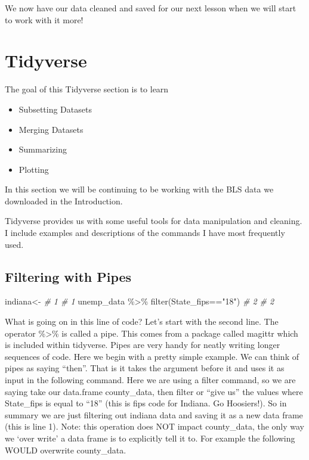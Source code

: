 \documentclass[
]{book}
\newenvironment{Shaded}{\begin{snugshade}}{\end{snugshade}}
\newcommand{\CommentTok}[1]{\textcolor[rgb]{0.56,0.35,0.01}{\textit{#1}}}
\newcommand{\FunctionTok}[1]{\textcolor[rgb]{0.00,0.00,0.00}{#1}}
\newcommand{\NormalTok}[1]{#1}
\newcommand{\OtherTok}[1]{\textcolor[rgb]{0.56,0.35,0.01}{#1}}
\newcommand{\SpecialCharTok}[1]{\textcolor[rgb]{0.00,0.00,0.00}{#1}}
\newcommand{\StringTok}[1]{\textcolor[rgb]{0.31,0.60,0.02}{#1}}
\providecommand{\tightlist}{%
  \setlength{\itemsep}{0pt}\setlength{\parskip}{0pt}}
\begin{document}
We now have our data cleaned and saved for our next lesson when we will start to work with it more!

\hypertarget{tidyverse}{%
\chapter{Tidyverse}\label{tidyverse}}

The goal of this Tidyverse section is to learn

\begin{itemize}
\tightlist
\item
  Subsetting Datasets
\item
  Merging Datasets
\item
  Summarizing
\item
  Plotting
\end{itemize}

In this section we will be continuing to be working with the BLS data we downloaded in the Introduction.

Tidyverse provides us with some useful tools for data manipulation and cleaning. I include examples and descriptions of the commands I have most frequently used.

\hypertarget{filtering-with-pipes}{%
\section{Filtering with Pipes}\label{filtering-with-pipes}}

\begin{Shaded}
\begin{Highlighting}[]
\NormalTok{indiana}\OtherTok{\textless{}{-}}                                    \CommentTok{\# 1  \# 1}
\NormalTok{    unemp\_data }\SpecialCharTok{\%\textgreater{}\%} \FunctionTok{filter}\NormalTok{(State\_fips}\SpecialCharTok{==}\StringTok{"18"}\NormalTok{)  }\CommentTok{\# 2  \# 2}
\end{Highlighting}
\end{Shaded}

What is going on in this line of code? Let's start with the second line. The operator \%\textgreater\% is called a pipe. This comes from a package called magittr which is included within tidyverse. Pipes are very handy for neatly writing longer sequences of code. Here we begin with a pretty simple example. We can think of pipes as saying ``then''. That is it takes the argument before it and uses it as input in the following command. Here we are using a filter command, so we are saying take our data.frame county\_data, then filter or ``give us'' the values where State\_fips is equal to ``18'' (this is fips code for Indiana. Go Hoosiers!). So in summary we are just filtering out indiana data and saving it as a new data frame (this is line 1). Note: this operation does NOT impact county\_data, the only way we `over write' a data frame is to explicitly tell it to. For example the following WOULD overwrite county\_data.
\end{document}
